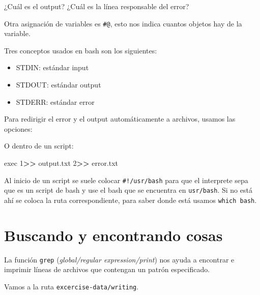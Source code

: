 \documentclass[
]{book}
\newenvironment{Shaded}{\begin{snugshade}}{\end{snugshade}}
\newcommand{\BuiltInTok}[1]{#1}
\newcommand{\DecValTok}[1]{\textcolor[rgb]{0.00,0.00,0.81}{#1}}
\newcommand{\ExtensionTok}[1]{#1}
\newcommand{\KeywordTok}[1]{\textcolor[rgb]{0.13,0.29,0.53}{\textbf{#1}}}
\newcommand{\NormalTok}[1]{#1}
\newcommand{\OperatorTok}[1]{\textcolor[rgb]{0.81,0.36,0.00}{\textbf{#1}}}
\begin{document}
¿Cuál es el output? ¿Cuál es la línea responsable del error?

Otra asignación de variables es \texttt{\#@}, esto nos indica cuantos objetos hay de la variable.

Tres conceptos usados en bash son los siguientes:

\begin{itemize}
\item
  STDIN: estándar input
\item
  STDOUT: estándar output
\item
  STDERR: estándar error
\end{itemize}

Para redirigir el error y el output automáticamente a archivos, usamos las opciones:

\begin{Shaded}
\end{Shaded}

O dentro de un script:

\begin{Shaded}
\begin{Highlighting}[]
\BuiltInTok{exec} \DecValTok{1}\OperatorTok{\textgreater{}\textgreater{}}\NormalTok{ output.txt }\DecValTok{2}\OperatorTok{\textgreater{}\textgreater{}}\NormalTok{ error.txt}
\end{Highlighting}
\end{Shaded}

Al inicio de un script se suele colocar \texttt{\#!/usr/bash} para que el interprete sepa que es un script de bash y use el bash que se encuentra en \texttt{usr/bash}. Si no está ahí se coloca la ruta correspondiente, para saber donde está usamos \texttt{which\ bash}.

\hypertarget{buscando-y-encontrando-cosas}{%
\section{Buscando y encontrando cosas}\label{buscando-y-encontrando-cosas}}

La función \texttt{grep} (\emph{global/regular expression/print}) nos ayuda a encontrar e imprimir líneas de archivos que contengan un patrón especificado.

Vamos a la ruta \texttt{excercise-data/writing}.
\end{document}
